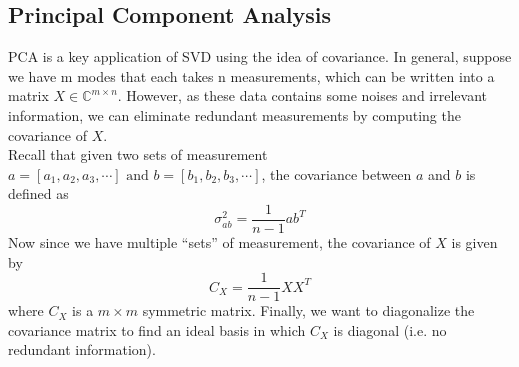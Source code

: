 \documentclass[11pt,a4paper]{article}
\numberwithin{equation}{subsection}
\begin{document}
\subsection{Principal Component Analysis}
PCA is a key application of SVD using the idea of covariance. In general, suppose we have m modes that each takes n measurements, which can be written into a matrix $X\in\mathbb{C}^{m\times n}$. However, as these data contains some noises and irrelevant information, we can eliminate redundant measurements by computing the covariance of $X$.\\
Recall that given two sets of measurement $a=[a_1, a_2, a_3, \cdots] \text{ and } b=[b_1, b_2, b_3, \cdots]$, the covariance between $a$ and $b$ is defined as \cite{582}
\begin{equation}
\sigma^{2}_{ab}=\frac{1}{n-1}ab^T
\end{equation}
Now since we have multiple ``sets'' of measurement, the covariance of $X$ is given by \cite{582}
\begin{equation}
C_X=\frac{1}{n-1}XX^T
\end{equation}
where $C_X$ is a $m\times m$ symmetric matrix. Finally, we want to diagonalize the covariance matrix to find an ideal basis in which $C_X$ is diagonal (i.e. no redundant information).
\end{document}
